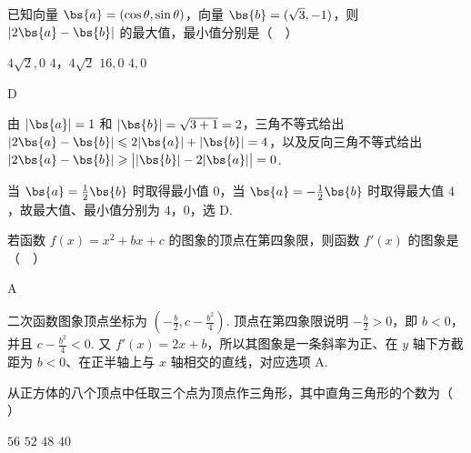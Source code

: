 \begin{problem}
已知向量 \(\bs{a} = (\cos \theta, \sin \theta)\)，向量 \(\bs{b} = (\sqrt{3}, -1)\)，则 \(\left|2\bs{a} - \bs{b}\right|\) 的最大值，最小值分别是（\(\quad\)）

\choices
    {\(4\sqrt{2}, 0\)}
    {\(4\)，\(4\sqrt{2}\)}
    {\(16, 0\)}
    {\(4, 0\)}
\end{problem}

\begin{answer}
D
\end{answer}

\begin{solution}
由 \(|\bs{a}|=1\) 和 \(|\bs{b}|=\sqrt{3+1}=2\)，三角不等式给出
\(\left|2\bs{a}-\bs{b}\right|\leqslant2|\bs{a}|+|\bs{b}|=4\)，以及反向三角不等式给出 \(\left|2\bs{a}-\bs{b}\right|\geqslant\bigl||\bs{b}|-2|\bs{a}|\bigr|=0\).

当 \(\bs{a}=\frac{1}{2}\bs{b}\) 时取得最小值 \(0\)，当 \(\bs{a}=-\frac{1}{2}\bs{b}\) 时取得最大值 \(4\)，故最大值、最小值分别为 \(4\)，\(0\)，选 D.
\end{solution}

\begin{problem}
若函数 \( f(x) = x^{2} + bx + c \) 的图象的顶点在第四象限，则函数 \( f'(x) \) 的图象是（\(\quad\)）

    {}
    {}
    {}
\end{problem}

\begin{answer}
A
\end{answer}

\begin{solution}
二次函数图象顶点坐标为 \(\left(-\frac{b}{2},c-\frac{b^2}{4}\right)\). 顶点在第四象限说明 \(-\frac{b}{2}>0\)，即 \(b<0\)，并且 \(c-\frac{b^2}{4}<0\). 又 \(f'(x)=2x+b\)，所以其图象是一条斜率为正、在 \(y\) 轴下方截距为 \(b<0\)、在正半轴上与 \(x\) 轴相交的直线，对应选项 A.
\end{solution}

\begin{problem}
从正方体的八个顶点中任取三个点为顶点作三角形，其中直角三角形的个数为（\(\quad\)）

\choices
    {\(56\)}
    {\(52\)}
    {\(48\)}
    {\(40\)}
\end{problem}

